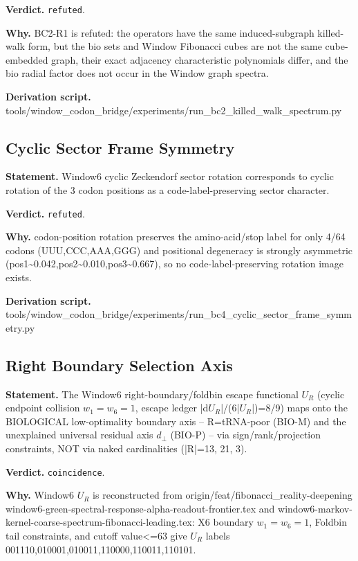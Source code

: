 \textbf{Verdict.} \texttt{refuted}.

\textbf{Why.} BC2-R1 is refuted: the operators have the same induced-subgraph killed-walk form, but the bio sets
and Window Fibonacci cubes are not the same cube-embedded graph, their exact adjacency
characteristic polynomials differ, and the bio radial factor does not occur in the Window graph
spectra.

\textbf{Derivation script.} tools/window\_codon\_bridge/experiments/run\_bc2\_killed\_walk\_spectrum.py

\subsection{Cyclic Sector Frame Symmetry}\label{sec:bridge-cyclic-sector-frame-symmetry}
\textbf{Statement.} Window6 cyclic Zeckendorf sector rotation corresponds to cyclic rotation of the 3 codon positions as
a code-label-preserving sector character.

\textbf{Verdict.} \texttt{refuted}.

\textbf{Why.} codon-position rotation preserves the amino-acid/stop label for only 4/64 codons (UUU,CCC,AAA,GGG)
and positional degeneracy is strongly asymmetric
(pos1\textasciitilde{}0.042,pos2\textasciitilde{}0.010,pos3\textasciitilde{}0.667), so no
code-label-preserving rotation image exists.

\textbf{Derivation script.} tools/window\_codon\_bridge/experiments/run\_bc4\_cyclic\_sector\_frame\_symmetry.py

\subsection{Right Boundary Selection Axis}\label{sec:bridge-right-boundary-selection-axis}
\textbf{Statement.} The Window6 right-boundary/foldbin escape functional $U_R$ (cyclic endpoint collision $w_1=w_6=1$,
escape ledger |d$U_R$|/(6|$U_R$|)=8/9) maps onto the BIOLOGICAL low-optimality boundary axis --
R=tRNA-poor (BIO-M) and the unexplained universal residual axis $d_{\perp}$ (BIO-P) -- via
sign/rank/projection constraints, NOT via naked cardinalities (|R|=13, 21, 3).

\textbf{Verdict.} \texttt{coincidence}.

\textbf{Why.} Window6 $U_R$ is reconstructed from origin/feat/fibonacci\_reality-deepening
window6-green-spectral-response-alpha-readout-frontier.tex and
window6-markov-kernel-coarse-spectrum-fibonacci-leading.tex: X6 boundary $w_1=w_6=1$, Foldbin tail
constraints, and cutoff value<=63 give $U_R$ labels 001110,010001,010011,110000,110011,110101.

